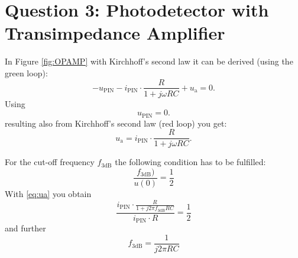 \section{Question 3: Photodetector with Transimpedance Amplifier}

In Figure \ref{fig:OPAMP} with Kirchhoff's second law it can be derived (using the green loop):
\begin{equation}
 - u_{\mathrm{PIN}} - i_{\mathrm{PIN}}\cdot \frac{R}{1+ j\omega RC}+u_{\mathrm{a}} = 0 .
\label{eq:masche1}
\end{equation}
Using
\begin{equation}
 u_{\mathrm{PIN}}=0.
\label{eq:masche2}
\end{equation}
resulting also from Kirchhoff's second law (red loop) you get:
\begin{equation}
 u_{\mathrm{a}} = i_{\mathrm{PIN}}\cdot \frac{R}{1+ j\omega RC}.
\label{eq:ua}
\end{equation}

For the cut-off frequency $f_{\mathrm{3dB}}$ the following condition has to be fulfilled:
\begin{equation}
 \frac{f_{\mathrm{3dB}})}{u(0)} = \frac{1}{2}
\end{equation}
With \eqref{eq:ua} you obtain
\begin{equation}
 \frac{i_{\mathrm{PIN}}\cdot \frac{R}{1+ j2\pi f_{\mathrm{3dB}} RC}}{i_{\mathrm{PIN}}\cdot R} = \frac{1}{2}
\end{equation}
and further
\begin{equation}
 f_{\mathrm{3dB}} = \frac{1}{j2\pi RC} 
\end{equation}

 

